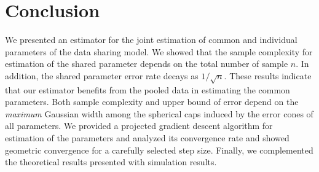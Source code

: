 \section{Conclusion}
We presented an estimator for the joint estimation of common and individual parameters of the data sharing model. 
We showed that the sample complexity for estimation of the shared parameter depends on the total number of sample $n$.
In addition, the shared parameter error rate decays as $1/\sqrt{n}$. 
These results indicate that our estimator benefits from the pooled data in estimating the common parameters. 
Both sample complexity and upper bound of error depend on the \emph{maximum} Gaussian width among the spherical caps induced by the error cones of all parameters.
We provided a projected gradient descent algorithm for estimation of the parameters and analyzed its convergence rate and showed geometric convergence for a carefully selected step size. Finally, we complemented the theoretical results presented with simulation results.
